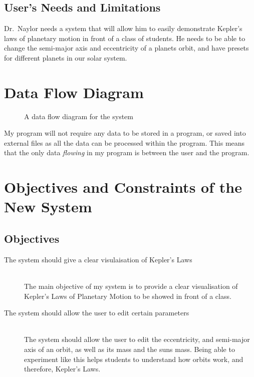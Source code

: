 \subsection{User's Needs and Limitations} 
Dr.~Naylor needs a system that will allow him to easily demonstrate Kepler's
laws of planetary motion in front of a class of students. He needs to be able
to change the semi-major axis and eccentricity of a planets orbit, and have
presets for different planets in our solar system. 

\section{Data Flow Diagram}
\begin{figure}[h]
	\centerline{}
	\caption{A data flow diagram for the system}
	\label{fig:dfd}
\end{figure}
My program will not require any data to be stored in a program, or saved into
external files as all the data can be processed within the program. This means
that the only data \emph{flowing} in my program is between the user and the
program. 

\section{Objectives and Constraints of the New System}

\subsection{Objectives}
\begin{description}
	\item[The system should give a clear visulaisation of Kepler's Laws]
		\hfill \\
		The main objective of my system is to provide a clear
		visualisation of Kepler's Laws of Planetary Motion to be showed
		in front of a class.	
	\item[The system should allow the user to edit certain parameters] 
		\hfill \\
		The system should allow the user to edit the eccentricity, and
		semi-major axis of an orbit, as well as its mass and the suns
		mass. Being able to experiment like this helps students to
		understand how orbits work, and therefore, Kepler's Laws.

\end{description}


